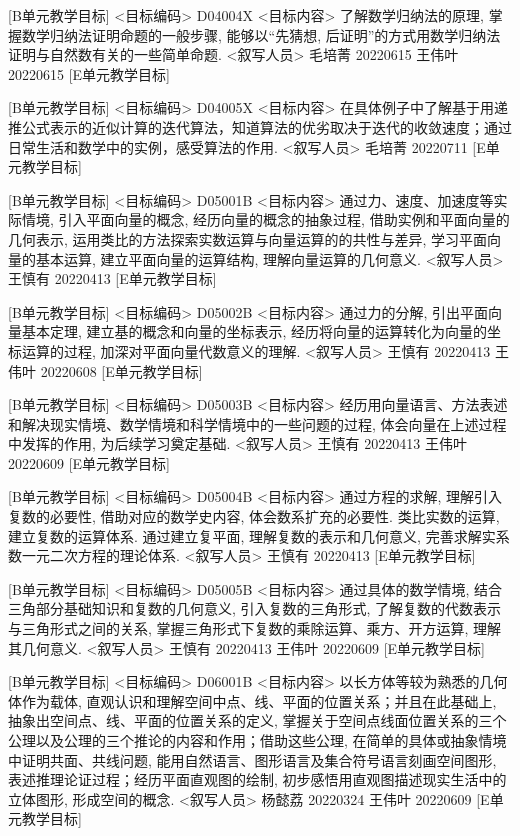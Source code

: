 \documentclass[10pt,a4paper]{article}
\begin{document}
[B单元教学目标]
<目标编码>
D04004X
<目标内容>
了解数学归纳法的原理, 掌握数学归纳法证明命题的一般步骤, 能够以“先猜想, 后证明”的方式用数学归纳法证明与自然数有关的一些简单命题.
<叙写人员>
毛培菁  20220615
王伟叶  20220615
[E单元教学目标]

[B单元教学目标]
<目标编码>
D04005X
<目标内容>
在具体例子中了解基于用递推公式表示的近似计算的迭代算法，知道算法的优劣取决于迭代的收敛速度；通过日常生活和数学中的实例，感受算法的作用.
<叙写人员>
毛培菁  20220711
[E单元教学目标]





[B单元教学目标]
<目标编码>
D05001B
<目标内容>
通过力、速度、加速度等实际情境, 引入平面向量的概念, 经历向量的概念的抽象过程, 借助实例和平面向量的几何表示, 运用类比的方法探索实数运算与向量运算的的共性与差异, 学习平面向量的基本运算, 建立平面向量的运算结构, 理解向量运算的几何意义.
<叙写人员>
王慎有  20220413
[E单元教学目标]


[B单元教学目标]
<目标编码>
D05002B
<目标内容>
通过力的分解, 引出平面向量基本定理, 建立基的概念和向量的坐标表示, 经历将向量的运算转化为向量的坐标运算的过程, 加深对平面向量代数意义的理解.
<叙写人员>
王慎有  20220413
王伟叶  20220608
[E单元教学目标]


[B单元教学目标]
<目标编码>
D05003B
<目标内容>
经历用向量语言、方法表述和解决现实情境、数学情境和科学情境中的一些问题的过程, 体会向量在上述过程中发挥的作用, 为后续学习奠定基础.
<叙写人员>
王慎有  20220413
王伟叶  20220609
[E单元教学目标]


[B单元教学目标]
<目标编码>
D05004B
<目标内容>
通过方程的求解, 理解引入复数的必要性, 借助对应的数学史内容, 体会数系扩充的必要性. 类比实数的运算, 建立复数的运算体系. 通过建立复平面, 理解复数的表示和几何意义, 完善求解实系数一元二次方程的理论体系.
<叙写人员>
王慎有  20220413
[E单元教学目标]


[B单元教学目标]
<目标编码>
D05005B
<目标内容>
通过具体的数学情境, 结合三角部分基础知识和复数的几何意义, 引入复数的三角形式, 了解复数的代数表示与三角形式之间的关系, 掌握三角形式下复数的乘除运算、乘方、开方运算, 理解其几何意义.
<叙写人员>
王慎有  20220413
王伟叶  20220609
[E单元教学目标]




[B单元教学目标]
<目标编码>
D06001B
<目标内容>
以长方体等较为熟悉的几何体作为载体, 直观认识和理解空间中点、线、平面的位置关系；并且在此基础上, 抽象出空间点、线、平面的位置关系的定义, 掌握关于空间点线面位置关系的三个公理以及公理的三个推论的内容和作用；借助这些公理, 在简单的具体或抽象情境中证明共面、共线问题, 能用自然语言、图形语言及集合符号语言刻画空间图形, 表述推理论证过程；经历平面直观图的绘制, 初步感悟用直观图描述现实生活中的立体图形, 形成空间的概念.
<叙写人员>
杨懿荔  20220324
王伟叶  20220609
[E单元教学目标]
\end{document}

